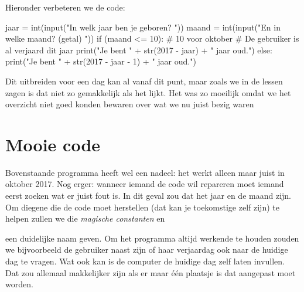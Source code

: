   Hieronder verbeteren we de code:
  \begin{python}
    jaar  = int(input("In welk jaar ben je geboren? "))
    maand = int(input("En in welke maand? (getal) "))
    if (maand <= 10): # 10 voor oktober
      # De gebruiker is al verjaard dit jaar
      print("Je bent " + str(2017 - jaar) + " jaar oud.")
    else:
      print("Je bent " + str(2017 - jaar - 1) + " jaar oud.")
  \end{python}
  Dit uitbreiden voor een dag kan al vanaf dit punt, maar zoals we in de lessen
  zagen is dat niet zo gemakkelijk als het lijkt. Het was zo moeilijk omdat we
  het overzicht niet goed konden bewaren over wat we nu juist bezig waren

  \section{Mooie code}
  Bovenstaande programma heeft wel een nadeel: het werkt alleen maar juist in
  oktober 2017. Nog erger: wanneer iemand de code wil repareren moet iemand
  eerst zoeken wat er juist fout is. In dit geval zou dat het jaar en de maand
  zijn. Om diegene die de code moet herstellen (dat kan je toekomstige zelf
  zijn) te helpen zullen we die \emph{magische constanten}  en 
  een duidelijke naam geven. Om het programma altijd werkende te houden zouden
  we bijvoorbeeld de gebruiker naast zijn of haar verjaardag ook naar de
  huidige dag te vragen. Wat ook kan is de computer de huidige dag zelf laten
  invullen. Dat zou allemaal makkelijker zijn als er maar \'e\'en plaatsje is dat
  aangepast moet worden.

